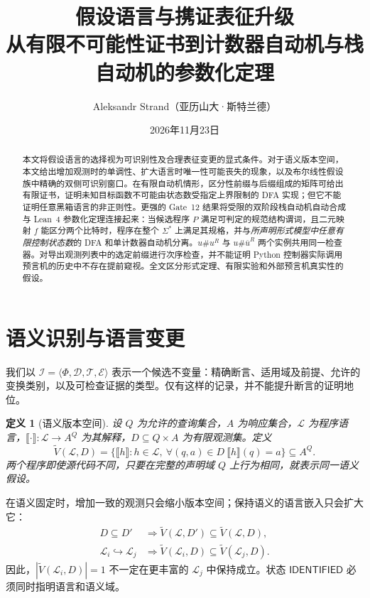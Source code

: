 \documentclass[11pt,a4paper,UTF8,fontset=none]{ctexart}
\title{\bfseries\color{ink}假设语言与携证表征升级\\[4pt]
\large\normalfont 从有限不可能性证书到计数器自动机与栈自动机的参数化定理}
\author{Aleksandr Strand（亚历山大·斯特兰德）}
\date{2026年11月23日}
\newtheorem{definition}{定义}[section]
\newcommand{\sem}[1]{\llbracket #1\rrbracket}
\newcommand{\VS}{\widetilde V}
\newcommand{\vstatus}[1]{\textsf{#1}}
\begin{document}
\maketitle
\vspace{-1.0em}
\begin{abstract}
本文将假设语言的选择视为可识别性及合理表征变更的显式条件。对于语义版本空间，本文给出增加观测时的单调性、扩大语言时唯一性可能丧失的现象，以及布尔线性假设族中精确的双侧可识别窗口。在有限自动机情形，区分性前缀与后缀组成的矩阵可给出有限证书，证明未知目标函数不可能由状态数受指定上界限制的 DFA 实现；但它不能证明任意黑箱语言的非正则性。更强的 Gate~12 结果将受限的双阶段栈自动机自动合成与 Lean~4 参数化定理连接起来：当候选程序 $P$ 满足可判定的规范结构谓词，且二元映射 $f$ 能区分两个比特时，程序在整个 $\Sigma^*$ 上满足其规格，并与\emph{所声明形式模型中任意有限控制状态数}的 DFA 和单计数器自动机分离。$u\#u^R$ 与 $u\#\overline{u}^R$ 两个实例共用同一检查器。对导出观测列表中的选定前缀进行次序检查，并不能证明 Python 控制器实际调用预言机的历史中不存在提前窥视。全文区分形式定理、有限实验和外部预言机真实性的假设。
\end{abstract}

\section{语义识别与语言变更}

我们以 $\mathcal I=\langle\Phi,\mathcal D,\mathcal T,\mathcal E\rangle$ 表示一个候选不变量：精确断言、适用域及前提、允许的变换类别，以及可检查证据的类型。仅有这样的记录，并不能提升断言的证明地位。

\begin{definition}[语义版本空间]
设 $Q$ 为允许的查询集合，$A$ 为响应集合，$\mathcal L$ 为程序语言，$\sem\cdot:\mathcal L\to A^Q$ 为其解释，$D\subseteq Q\times A$ 为有限观测集。定义
\begin{equation}\label{eq:version}
\VS(\mathcal L,D)=\{\sem h:h\in\mathcal L,\ \forall(q,a)\in D\ \sem h(q)=a\}\subseteq A^Q.
\end{equation}
两个程序即使源代码不同，只要在完整的声明域 $Q$ 上行为相同，就表示同一语义假设。
\end{definition}

在语义固定时，增加一致的观测只会缩小版本空间；保持语义的语言嵌入只会扩大它：
\begin{equation}\label{eq:monotonic}
\begin{aligned}
D\subseteq D'&\Longrightarrow\VS(\mathcal L,D')\subseteq\VS(\mathcal L,D),\\
\mathcal L_i\hookrightarrow\mathcal L_j&\Longrightarrow\VS(\mathcal L_i,D)\subseteq\VS(\mathcal L_j,D).
\end{aligned}
\end{equation}
因此，$|\VS(\mathcal L_i,D)|=1$ 不一定在更丰富的 $\mathcal L_j$ 中保持成立。状态 $\vstatus{IDENTIFIED}$ 必须同时指明语言和语义域。
\end{document}
